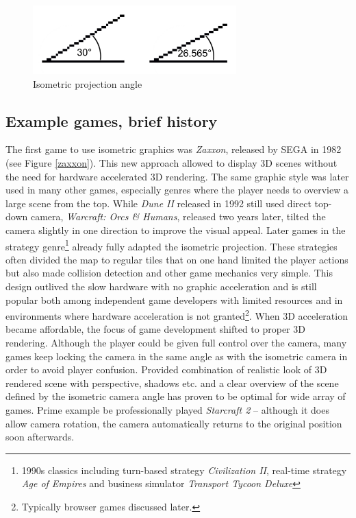 \documentclass[11pt,oneside, final]{fithesis2}
\begin{document}
\begin{figure}[h]
	\centering
	\includegraphics[width=0.7\textwidth]{thesis-angles}
	\caption{Isometric projection angle}
	\label{isoangle}
\end{figure}

\subsection{Example games, brief history}
The first game to use isometric graphics was \emph{Zaxxon}, released by SEGA in 1982\cite{zaxxon} (see Figure \ref{zaxxon}). This new approach allowed to display 3D scenes without the need for hardware accelerated 3D rendering. The same graphic style was later used in many other games, especially genres where the player needs to overview a large scene from the top. While \emph{Dune II} released in 1992\cite{dune2} still used direct top-down camera, \emph{Warcraft: Orcs \& Humans}, released two years later\cite{blizzardlegacy}, tilted the camera slightly in one direction to improve the visual appeal. Later games in the strategy genre\footnote{1990s classics including turn-based strategy \emph{Civilization II}\cite{civ2}, real-time strategy \emph{Age of Empires}\cite{ageofempires} and business simulator \emph{Transport Tycoon Deluxe}\cite{ttd}} already fully adapted the isometric projection. These strategies often divided the map to regular tiles that on one hand limited the player actions but also made collision detection and other game mechanics very simple. This design outlived the slow hardware with no graphic acceleration and is still popular both among independent game developers with limited resources and in environments where hardware acceleration is not granted\footnote{Typically browser games discussed later.}. When 3D acceleration became affordable, the focus of game development shifted to proper 3D rendering. Although the player could be given full control over the camera, many games keep locking the camera in the same angle as with the isometric camera in order to avoid player confusion. Provided combination of realistic look of 3D rendered scene with perspective, shadows etc. and a clear overview of the scene defined by the isometric camera angle has proven to be optimal for wide array of games. Prime example be professionally played \emph{Starcraft 2}\cite{sc2} -- although it does allow camera rotation, the camera automatically returns to the original position soon afterwards.
\end{document}
